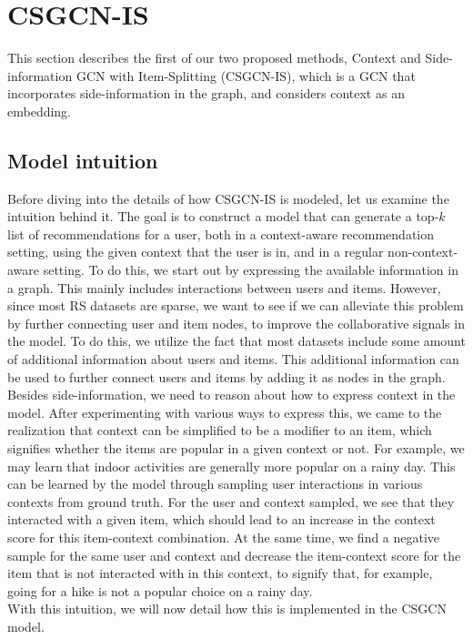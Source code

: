 \section{CSGCN-IS}\label{sec:csgcn_is}
This section describes the first of our two proposed methods, Context and Side-information GCN with Item-Splitting (CSGCN-IS), which is a GCN that incorporates side-information in the graph, and considers context as an embedding.

\subsection{Model intuition}\label{subsec:csgcn_is_intuition}
Before diving into the details of how CSGCN-IS is modeled, let us examine the intuition behind it.
The goal is to construct a model that can generate a top-$k$ list of recommendations for a user, both in a context-aware recommendation setting, using the given context that the user is in, and in a regular non-context-aware setting.
To do this, we start out by expressing the available information in a graph.
This mainly includes interactions between users and items.
However, since most RS datasets are sparse, we want to see if we can alleviate this problem by further connecting user and item nodes, to improve the collaborative signals in the model.
To do this, we utilize the fact that most datasets include some amount of additional information about users and items.
This additional information can be used to further connect users and items by adding it as nodes in the graph.\\
Besides side-information, we need to reason about how to express context in the model.
After experimenting with various ways to express this, we came to the realization that context can be simplified to be a modifier to an item, which signifies whether the items are popular in a given context or not.
For example, we may learn that indoor activities are generally more popular on a rainy day.
This can be learned by the model through sampling user interactions in various contexts from ground truth.
For the user and context sampled, we see that they interacted with a given item, which should lead to an increase in the context score for this item-context combination.
At the same time, we find a negative sample for the same user and context and decrease the item-context score for the item that is not interacted with in this context, to signify that, for example, going for a hike is not a popular choice on a rainy day.\\
With this intuition, we will now detail how this is implemented in the CSGCN model.

